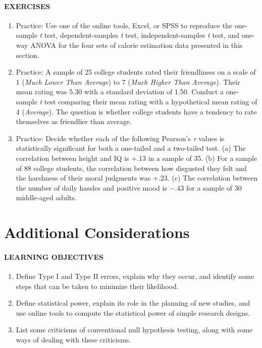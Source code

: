 \documentclass[
]{krantz}
\providecommand{\tightlist}{%
  \setlength{\itemsep}{0pt}\setlength{\parskip}{0pt}}
\begin{document}
\paragraph*{EXERCISES}\label{exercises-29}

\begin{enumerate}
\def\labelenumi{\arabic{enumi}.}
\tightlist
\item
  Practice: Use one of the online tools, Excel, or SPSS to reproduce the one-sample \emph{t} test, dependent-samples \emph{t} test, independent-samples \emph{t} test, and one-way ANOVA for the four sets of calorie estimation data presented in this section.
\item
  Practice: A sample of 25 college students rated their friendliness on a scale of 1 (\emph{Much Lower Than Average}) to 7 (\emph{Much Higher Than Average}). Their mean rating was 5.30 with a standard deviation of 1.50. Conduct a one-sample \emph{t} test comparing their mean rating with a hypothetical mean rating of 4 (\emph{Average}). The question is whether college students have a tendency to rate themselves as friendlier than average.
\item
  Practice: Decide whether each of the following Pearson's \emph{r} values is statistically significant for both a one-tailed and a two-tailed test. (a) The correlation between height and IQ is +.13 in a sample of 35. (b) For a sample of 88 college students, the correlation between how disgusted they felt and the harshness of their moral judgments was +.23. (c) The correlation between the number of daily hassles and positive mood is −.43 for a sample of 30 middle-aged adults.
\end{enumerate}

\section{Additional Considerations}\label{additional-considerations}

\paragraph*{LEARNING OBJECTIVES}\label{learning-objectives-38}

\begin{enumerate}
\def\labelenumi{\arabic{enumi}.}
\tightlist
\item
  Define Type I and Type II errors, explain why they occur, and identify some steps that can be taken to minimize their likelihood.
\item
  Define statistical power, explain its role in the planning of new studies, and use online tools to compute the statistical power of simple research designs.
\item
  List some criticisms of conventional null hypothesis testing, along with some ways of dealing with these criticisms.
\end{enumerate}
\end{document}
